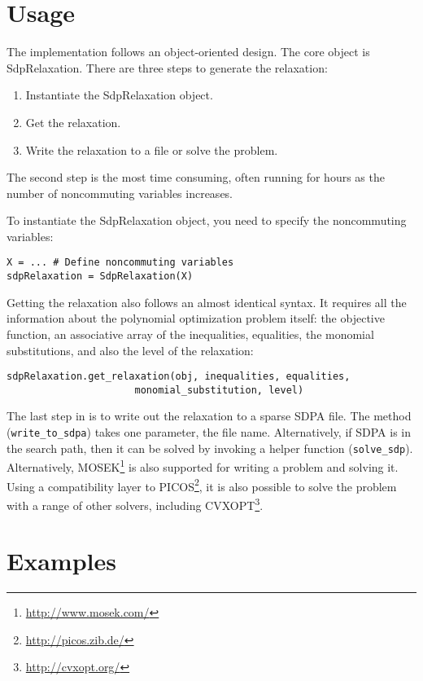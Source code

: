 \documentclass{article}
\begin{document}
\section{Usage}
The implementation follows an object-oriented design. The core object is SdpRelaxation. There are three steps to generate the relaxation:
\begin{enumerate}
  \item Instantiate the SdpRelaxation object.
  \item Get the relaxation.
  \item Write the relaxation to a file or solve the problem.
\end{enumerate}

The second step is the most time consuming, often running for hours as the number of noncommuting variables increases.

To instantiate the SdpRelaxation object, you need to specify the noncommuting variables:
\begin{verbatim}
X = ... # Define noncommuting variables
sdpRelaxation = SdpRelaxation(X)
\end{verbatim}

Getting the relaxation also follows an almost identical syntax. It requires all the information about the polynomial optimization problem itself: the objective function, an associative array of the inequalities, equalities, the monomial substitutions, and also the level of the relaxation:
\begin{verbatim}
sdpRelaxation.get_relaxation(obj, inequalities, equalities, 
                      monomial_substitution, level)
\end{verbatim}

The last step in is to write out the relaxation to a sparse SDPA file. The method (\verb+write_to_sdpa+) takes one parameter, the file name. Alternatively, if SDPA is in the search path, then it can be solved by invoking a helper function (\verb+solve_sdp+). Alternatively, MOSEK\footnote{\url{http://www.mosek.com/}} is also supported for writing a problem and solving it. Using a compatibility layer to PICOS\footnote{\url{http://picos.zib.de/}}, it is also possible to solve the problem with a range of other solvers, including CVXOPT\footnote{\url{http://cvxopt.org/}}.

\section{Examples}
\end{document}
